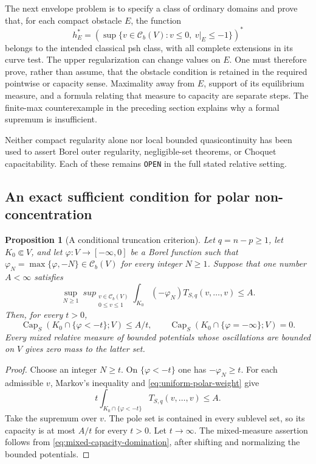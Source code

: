 \documentclass[11pt,a4paper]{article}
\numberwithin{equation}{section}
\newtheorem{proposition}[theorem]{Proposition}
\theoremstyle{definition}
\theoremstyle{remark}
\newcommand{\Cb}{\mathcal C_b}
\begin{document}
The next envelope problem is to specify a class of ordinary domains
and prove that, for each compact obstacle $E$, the function
\[
 h_E^*=\left(\sup\{v\in\Cb(V):v\leq0,\ v|_E\leq-1\}\right)^*
\]
belongs to the intended classical psh class, with all complete
extensions in its curve test. The upper regularization can change
values on $E$. One must therefore prove, rather than assume, that
the obstacle condition is retained in the required pointwise or
capacity sense. Maximality away from $E$, support of its equilibrium
measure, and a formula relating that measure to capacity are separate
steps. The finite-max counterexample in the preceding section explains
why a formal supremum is insufficient.

Neither compact regularity alone nor local bounded quasicontinuity
has been used to assert Borel outer regularity, negligible-set
theorems, or Choquet capacitability. Each of these remains
\texttt{OPEN} in the full stated relative setting.

\subsection{An exact sufficient condition for polar non-concentration}

\begin{proposition}[A conditional truncation criterion]
\label{prop:polar-truncation-criterion}
Let $q=n-p\geq1$, let $K_0\Subset V$, and let
$\varphi:V\to[-\infty,0]$ be a Borel function such that
$\varphi_N=\max\{\varphi,-N\}\in\Cb(V)$ for every integer $N\geq1$.
Suppose that one number $A<\infty$ satisfies
\begin{equation}
\label{eq:uniform-polar-weight}
 \sup_{N\geq1}\ sup_{\substack{v\in\Cb(V)\\0\leq v\leq1}}
       \int_{K_0}(-\varphi_N)T_{S,q}(v,\ldots,v)\leq A.
\end{equation}
Then, for every $t>0$,
\[
 \operatorname{Cap}_S(K_0\cap\{\varphi<-t\};V)\leq A/t,
 \qquad
 \operatorname{Cap}_S(K_0\cap\{\varphi=-\infty\};V)=0.
\]
Every mixed relative measure of bounded potentials whose oscillations
are bounded on $V$ gives zero mass to the latter set.
\end{proposition}

\begin{proof}
Choose an integer $N\geq t$. On $\{\varphi<-t\}$ one has
$-\varphi_N\geq t$. For each admissible $v$, Markov's inequality
and \eqref{eq:uniform-polar-weight} give
\[
 t\int_{K_0\cap\{\varphi<-t\}}T_{S,q}(v,\ldots,v)\leq A.
\]
Take the supremum over $v$. The pole set is contained in every
sublevel set, so its capacity is at most $A/t$ for every $t>0$.
Let $t\to\infty$. The mixed-measure assertion follows from
\eqref{eq:mixed-capacity-domination}, after shifting and normalizing
the bounded potentials.
\end{proof}
\end{document}
